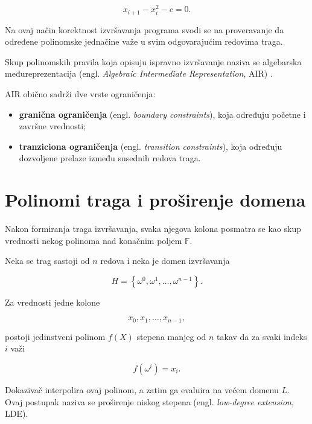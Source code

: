 \begin{equation}
    x_{i+1} - x_i^2 - c = 0.
\end{equation}

Na ovaj način korektnost izvršavanja programa svodi se na proveravanje da određene
polinomske jednačine važe u svim odgovarajućim redovima traga.

Skup polinomskih pravila koja opisuju ispravno izvršavanje naziva se algebarska
međureprezentacija (engl. \textit{Algebraic Intermediate Representation}, AIR)
\cite{stark2018,ethstark2023}.

AIR obično sadrži dve vrste ograničenja:

\begin{itemize}
    \item \textbf{granična ograničenja} (engl. \textit{boundary constraints}),
    koja određuju početne i završne vrednosti;

    \item \textbf{tranziciona ograničenja}
    (engl. \textit{transition constraints}), koja određuju dozvoljene prelaze
    između susednih redova traga.
\end{itemize}

\section{Polinomi traga i proširenje domena}

Nakon formiranja traga izvršavanja, svaka njegova kolona posmatra se kao skup
vrednosti nekog polinoma nad konačnim poljem \(\mathbb{F}\).

Neka se trag sastoji od \(n\) redova i neka je domen izvršavanja

\begin{equation}
    H = \left\{\omega^0,\omega^1,\ldots,\omega^{n-1}\right\}.
\end{equation}

Za vrednosti jedne kolone

\begin{equation}
    x_0,x_1,\ldots,x_{n-1},
\end{equation}

postoji jedinstveni polinom \(f(X)\) stepena manjeg od \(n\) takav da za svaki
indeks \(i\) važi

\begin{equation}
    f\left(\omega^i\right) = x_i.
\end{equation}

Dokazivač interpolira ovaj polinom, a zatim ga evaluira na većem domenu \(L\).
Ovaj postupak naziva se proširenje niskog stepena
(engl. \textit{low-degree extension}, LDE).

